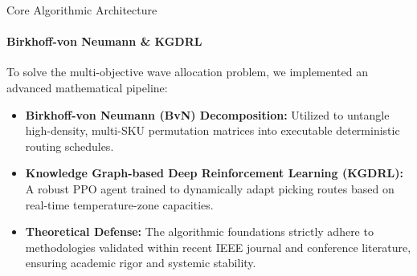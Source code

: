 \documentclass{beamer}
\begin{document}
\begin{frame}{Core Algorithmic Architecture}
  \framesubtitle{Birkhoff-von Neumann \& KGDRL}
  
  To solve the multi-objective wave allocation problem, we implemented an advanced mathematical pipeline:
  \vspace{0.3cm}
  \begin{itemize}
      \item \textbf{Birkhoff-von Neumann (BvN) Decomposition:} Utilized to untangle high-density, multi-SKU permutation matrices into executable deterministic routing schedules.
      \item \textbf{Knowledge Graph-based Deep Reinforcement Learning (KGDRL):} A robust PPO agent trained to dynamically adapt picking routes based on real-time temperature-zone capacities.
      \item \textbf{Theoretical Defense:} The algorithmic foundations strictly adhere to methodologies validated within recent IEEE journal and conference literature, ensuring academic rigor and systemic stability.
  \end{itemize}
\end{frame}
\end{document}
